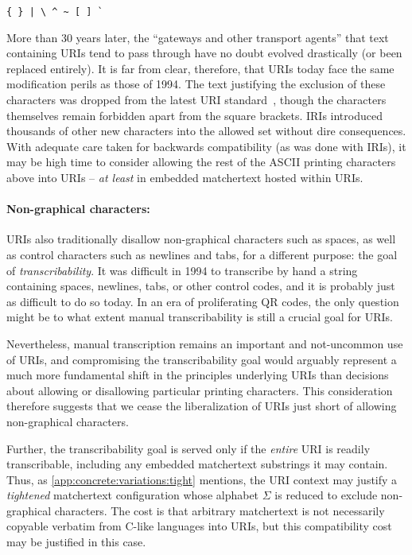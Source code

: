 \begin{center}
\verb|{ } |\texttt{|}\verb| \ ^ ~ [ ] `|
\end{center}

More than 30 years later,
the ``gateways and other transport agents'' that text containing URIs
tend to pass through have no doubt evolved drastically
(or been replaced entirely).
It is far from clear, therefore,
that URIs today face the same modification perils as those of 1994.
The text justifying the exclusion of these characters
was dropped from the latest URI standard~\cite{rfc3986},
though the characters themselves remain forbidden
apart from the square brackets.
IRIs introduced thousands of other new characters into the allowed set
without dire consequences.
With adequate care taken for backwards compatibility (as was done with IRIs),
it may be high time to consider allowing
the rest of the ASCII printing characters above into URIs --
\emph{at least} in embedded matchertext hosted within URIs.

\paragraph{Non-graphical characters:}

URIs also traditionally disallow non-graphical characters such as spaces,
as well as control characters such as newlines and tabs,
for a different purpose: the goal of \emph{transcribability}.
It was difficult in 1994 to transcribe by hand
a string containing spaces, newlines, tabs, or other control codes,
and it is probably just as difficult to do so today.
In an era of proliferating QR codes,
the only question might be to what extent manual transcribability
is still a crucial goal for URIs.

Nevertheless,
manual transcription remains an important and not-uncommon use of URIs,
and compromising the transcribability goal
would arguably represent a much more fundamental shift
in the principles underlying URIs
than decisions about allowing or disallowing particular printing characters.
This consideration therefore suggests that we
cease the liberalization of URIs just short of
allowing non-graphical characters.

Further, the transcribability goal is served
only if the \emph{entire} URI is readily transcribable,
including any embedded matchertext substrings it may contain.
Thus,
as \cref{app:concrete:variations:tight} mentions,
the URI context may justify a \emph{tightened} matchertext configuration
whose alphabet $\Sigma$ is reduced to exclude non-graphical characters.
The cost is that arbitrary matchertext is not necessarily copyable verbatim
from C-like languages into URIs,
but this compatibility cost may be justified in this case.

